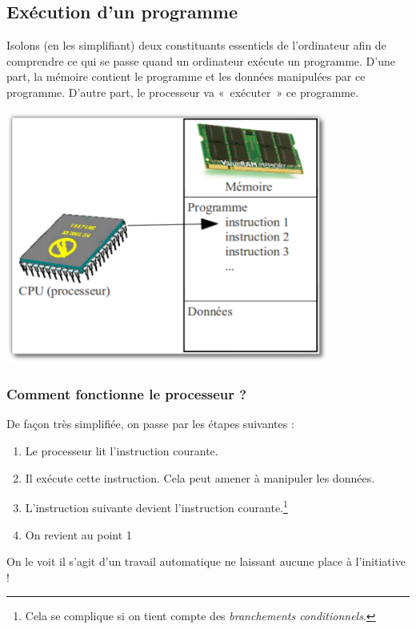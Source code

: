 	\subsection{Exécution d'un programme}

		Isolons (en les simplifiant) deux constituants essentiels de
		l'ordinateur afin de comprendre ce qui se passe quand
		un ordinateur exécute un programme. D'une part, la
		mémoire contient le programme et les données manipulées par ce
		programme. D'autre part, le processeur va «~exécuter~»
		ce programme.

		\begin{center}
		\includegraphics[width=0.8\textwidth]{image/intro-schema-ordi}
		\end{center}

	\subsubsection*{Comment fonctionne le processeur ?}

		De façon très simplifiée, on passe par les étapes suivantes :

		\begin{enumerate}
		\item Le processeur lit l'instruction courante.
		\item Il exécute cette instruction. Cela peut amener à manipuler les données.
		\item L'instruction suivante devient
			l'instruction courante.\footnote{Cela se complique si
			on tient compte des \textit{branchements conditionnels}.}
		\item On revient au point 1
		\end{enumerate}

		On le voit il s'agit d'un travail
		automatique ne laissant aucune place à l'initiative !

